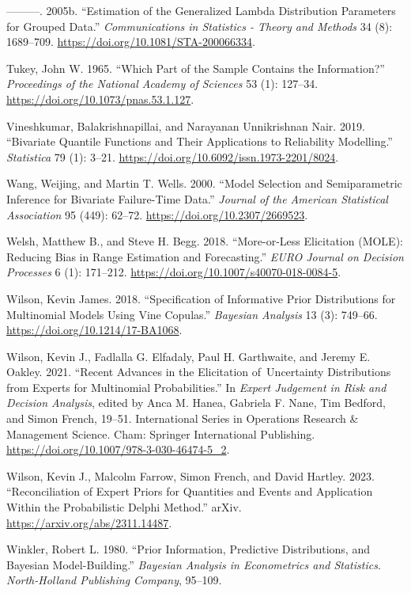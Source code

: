 \documentclass[
]{interact}
\newlength{\cslhangindent}
\newenvironment{CSLReferences}[2] %
 {\begin{list}{}{%
  \setlength{\itemindent}{0pt}
  \setlength{\leftmargin}{0pt}
  \setlength{\parsep}{0pt}
  \ifodd #1
   \setlength{\leftmargin}{\cslhangindent}
   \setlength{\itemindent}{-1\cslhangindent}
  \fi
  \setlength{\itemsep}{#2\baselineskip}}}
 {\end{list}}
\begin{document}
\begin{CSLReferences}{1}{0}
---------. 2005b. {``Estimation of the {Generalized Lambda Distribution
Parameters} for {Grouped Data}.''} \emph{Communications in Statistics -
Theory and Methods} 34 (8): 1689--709.
\url{https://doi.org/10.1081/STA-200066334}.

Tukey, John W. 1965. {``Which {Part} of the {Sample Contains} the
{Information}?''} \emph{Proceedings of the National Academy of Sciences}
53 (1): 127--34. \url{https://doi.org/10.1073/pnas.53.1.127}.

Vineshkumar, Balakrishnapillai, and Narayanan Unnikrishnan Nair. 2019.
{``Bivariate {Quantile Functions} and Their {Applications} to
{Reliability Modelling}.''} \emph{Statistica} 79 (1): 3--21.
\url{https://doi.org/10.6092/issn.1973-2201/8024}.

Wang, Weijing, and Martin T. Wells. 2000. {``Model {Selection} and
{Semiparametric Inference} for {Bivariate Failure-Time Data}.''}
\emph{Journal of the American Statistical Association} 95 (449): 62--72.
\url{https://doi.org/10.2307/2669523}.

Welsh, Matthew B., and Steve H. Begg. 2018. {``More-or-Less Elicitation
({MOLE}): Reducing Bias in Range Estimation and Forecasting.''}
\emph{EURO Journal on Decision Processes} 6 (1): 171--212.
\url{https://doi.org/10.1007/s40070-018-0084-5}.

Wilson, Kevin James. 2018. {``Specification of {Informative Prior
Distributions} for {Multinomial Models Using Vine Copulas}.''}
\emph{Bayesian Analysis} 13 (3): 749--66.
\url{https://doi.org/10.1214/17-BA1068}.

Wilson, Kevin J., Fadlalla G. Elfadaly, Paul H. Garthwaite, and Jeremy
E. Oakley. 2021. {``Recent {Advances} in the {Elicitation}
of~{Uncertainty Distributions} from {Experts} for {Multinomial
Probabilities}.''} In \emph{Expert {Judgement} in {Risk} and {Decision
Analysis}}, edited by Anca M. Hanea, Gabriela F. Nane, Tim Bedford, and
Simon French, 19--51. International {Series} in {Operations Research} \&
{Management Science}. Cham: Springer International Publishing.
\url{https://doi.org/10.1007/978-3-030-46474-5_2}.

Wilson, Kevin J., Malcolm Farrow, Simon French, and David Hartley. 2023.
{``Reconciliation of Expert Priors for Quantities and Events and
Application Within the Probabilistic {Delphi} Method.''} arXiv.
\url{https://arxiv.org/abs/2311.14487}.

Winkler, Robert L. 1980. {``Prior Information, Predictive Distributions,
and {Bayesian} Model-Building.''} \emph{Bayesian Analysis in
Econometrics and Statistics. North-Holland Publishing Company}, 95--109.

\end{CSLReferences}
\end{document}
